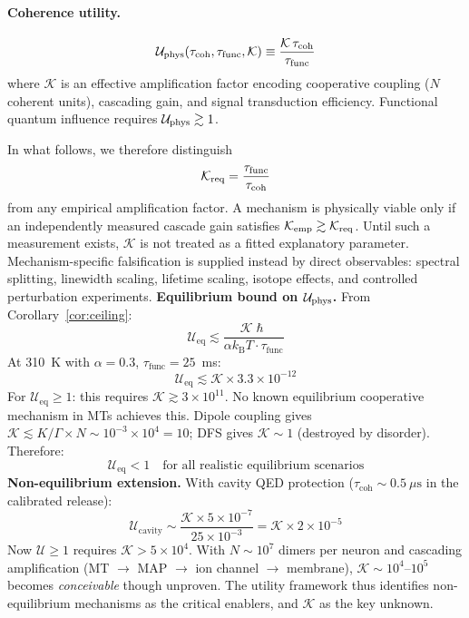 \documentclass[twocolumn,10pt]{article}
\renewcommand{\hbar}{\hslash}
\newcommand{\kB}{k_{\text{B}}}
\begin{document}
\paragraph{Coherence utility.}
\label{def:utility}
\begin{equation}
\mathcal{U}_{\rm phys}(\tau_{\text{coh}}, \tau_{\text{func}}, \mathcal{K})
\equiv \frac{\mathcal{K}\,\tau_{\text{coh}}}{\tau_{\text{func}}}
\label{eq:utility_phys}
\end{equation}
where $\mathcal{K}$ is an effective amplification factor encoding
cooperative coupling ($N$ coherent units), cascading gain, and signal
transduction efficiency. Functional quantum influence requires
$\mathcal{U}_{\rm phys} \gtrsim 1$.

In what follows, we therefore distinguish
\[
\mathcal{K}_{\rm req}=\frac{\tau_{\rm func}}{\tau_{\rm coh}}
\]
from any empirical amplification factor. A mechanism is physically viable
only if an independently measured cascade gain satisfies
$\mathcal{K}_{\rm emp}\gtrsim\mathcal{K}_{\rm req}$. Until such a measurement
exists, $\mathcal{K}$ is not treated as a fitted explanatory parameter.
Mechanism-specific falsification is supplied instead by direct observables:
spectral splitting, linewidth scaling, lifetime scaling, isotope effects, and
controlled perturbation experiments.
\textbf{Equilibrium bound on $\mathcal{U}_{\rm phys}$.} From
Corollary~\ref{cor:ceiling}:
\begin{equation}
\mathcal{U}_{\text{eq}} \lesssim
\frac{\mathcal{K}\hbar}{\alpha\kB T \cdot \tau_{\text{func}}}
\end{equation}
At 310~K with $\alpha = 0.3$, $\tau_{\text{func}} = 25$~ms:
\begin{equation}
\mathcal{U}_{\text{eq}} \lesssim \mathcal{K} \times 3.3 \times 10^{-12}
\end{equation}
For $\mathcal{U}_{\text{eq}} \geq 1$: this requires
$\mathcal{K} \gtrsim 3\times10^{11}$. No known equilibrium cooperative mechanism in MTs achieves this.
Dipole coupling gives $\mathcal{K} \lesssim K/\Gamma \times N \sim
10^{-3} \times 10^4 = 10$; DFS gives $\mathcal{K} \sim 1$ (destroyed by
disorder). Therefore:
\begin{equation}
\boxed{\mathcal{U}_{\text{eq}} < 1
\quad \text{for all realistic equilibrium scenarios}}
\end{equation}
\textbf{Non-equilibrium extension.} With cavity QED protection
($\tau_{\text{coh}} \sim 0.5~\mu\text{s}$ in the calibrated release):
\begin{equation}
\mathcal{U}_{\text{cavity}} \sim
\frac{\mathcal{K} \times 5\times 10^{-7}}{25 \times 10^{-3}}
= \mathcal{K} \times 2 \times 10^{-5}
\end{equation}
Now $\mathcal{U} \geq 1$ requires $\mathcal{K} > 5 \times 10^{4}$. With
$N \sim 10^7$ dimers per neuron and cascading amplification (MT $\to$ MAP
$\to$ ion channel $\to$ membrane), $\mathcal{K} \sim 10^4\text{--}10^5$
becomes \textit{conceivable} though unproven. The utility framework thus
identifies non-equilibrium mechanisms as the critical enablers, and
$\mathcal{K}$ as the key unknown.
\end{document}
